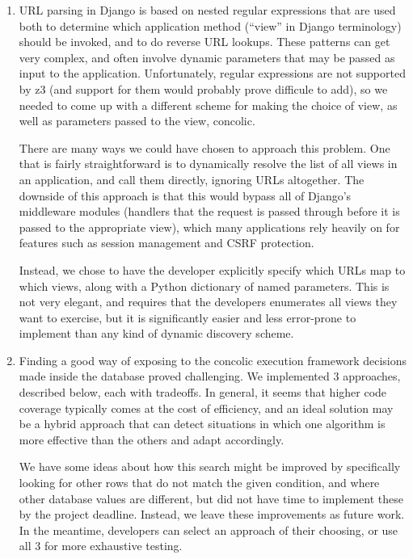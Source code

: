 \documentclass{scrartcl}
\begin{document}
\begin{enumerate}
\item URL parsing in Django is based on nested regular expressions that
are used both to determine which application method (``view''
in Django terminology) should be invoked, and to do reverse URL
lookups. These patterns can get very complex, and often involve
dynamic parameters that may be passed as input to the
application. Unfortunately, regular expressions are not
supported by z3 (and support for them would probably prove
difficule to add), so we needed to come up with a different
scheme for making the choice of view, as well as parameters
passed to the view, concolic.

There are many ways we could have chosen to approach this
problem. One that is fairly straightforward is to dynamically
resolve the list of all views in an application, and call them
directly, ignoring URLs altogether.  The downside of this
approach is that this would bypass all of Django's middleware
modules (handlers that the request is passed through before it
is passed to the appropriate view), which many applications
rely heavily on for features such as session management and
CSRF protection.

Instead, we chose to have the developer explicitly specify
which URLs map to which views, along with a Python dictionary
of named parameters. This is not very elegant, and requires
that the developers enumerates all views they want to exercise,
but it is significantly easier and less error-prone to
implement than any kind of dynamic discovery scheme.

\item Finding a good way of exposing to the concolic execution framework
decisions made inside the database proved challenging. We implemented 3
approaches, described below, each with tradeoffs. In general, it seems
that higher code coverage typically comes at the cost of efficiency, and an
ideal solution may be a hybrid approach that can detect situations in which
one algorithm is more effective than the others and adapt accordingly.

We have some ideas about how this search might be improved by
specifically looking for other rows that do not match the given
condition, and where other database values are different, but
did not have time to implement these by the project deadline.
Instead, we leave these improvements as future work. In the
meantime, developers can select an approach of their choosing, or use all 3
for more exhaustive testing.


\end{enumerate}
\end{document}
